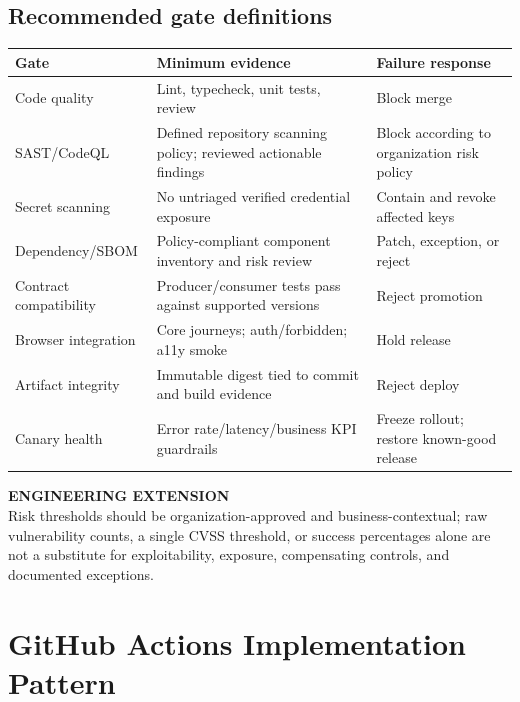 \documentclass[11pt,letterpaper,oneside]{report}
\newcommand{\added}[1]{\begin{engineerbox}\textbf{ENGINEERING EXTENSION}\\#1\end{engineerbox}}
\begin{document}
\section{Recommended gate definitions}
\begin{longtable}{>{\raggedright\arraybackslash}p{.2\linewidth}>{\raggedright\arraybackslash}p{.38\linewidth}>{\raggedright\arraybackslash}p{.32\linewidth}}\toprule Gate & Minimum evidence & Failure response \\\midrule
Code quality & Lint, typecheck, unit tests, review & Block merge\\
SAST/CodeQL & Defined repository scanning policy; reviewed actionable findings & Block according to organization risk policy\\
Secret scanning & No untriaged verified credential exposure & Contain and revoke affected keys\\
Dependency/SBOM & Policy-compliant component inventory and risk review & Patch, exception, or reject\\
Contract compatibility & Producer/consumer tests pass against supported versions & Reject promotion\\
Browser integration & Core journeys; auth/forbidden; a11y smoke & Hold release\\
Artifact integrity & Immutable digest tied to commit and build evidence & Reject deploy\\
Canary health & Error rate/latency/business KPI guardrails & Freeze rollout; restore known-good release\\\bottomrule\end{longtable}
\added{Risk thresholds should be organization-approved and business-contextual; raw vulnerability counts, a single CVSS threshold, or success percentages alone are not a substitute for exploitability, exposure, compensating controls, and documented exceptions.}
\chapter{GitHub Actions Implementation Pattern}
\end{document}
